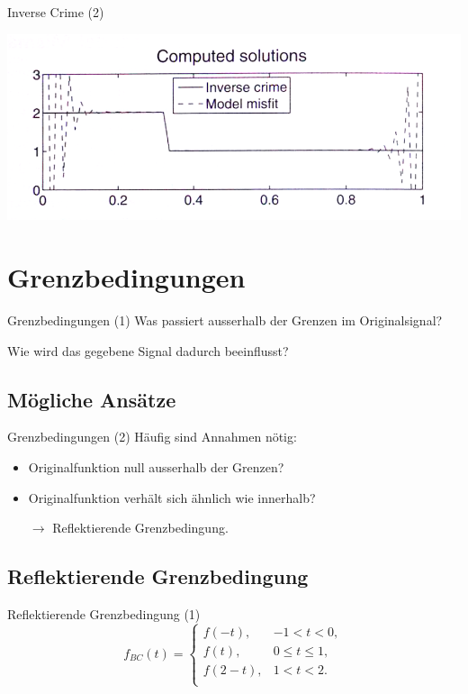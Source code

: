 \documentclass[11pt]{beamer}
\begin{document}
\begin{frame}{Inverse Crime (2)}

\begin{center}

\includegraphics[scale=0.5]{InverseCrime} 

\end{center}

\end{frame}


\section{Grenzbedingungen}
\begin{frame}{Grenzbedingungen (1)}
Was passiert ausserhalb der Grenzen im Originalsignal?

Wie wird das gegebene Signal dadurch beeinflusst?
\end{frame}


\subsection{Mögliche Ansätze}
\begin{frame}{Grenzbedingungen (2)}
Häufig sind Annahmen nötig:
\begin{itemize}
\item Originalfunktion null ausserhalb der Grenzen?
\item Originalfunktion verhält sich ähnlich wie innerhalb?

$\rightarrow$ Reflektierende Grenzbedingung.
\end{itemize}
\end{frame}


\subsection{Reflektierende Grenzbedingung}
\begin{frame}{Reflektierende Grenzbedingung (1)}
\[
f_{BC}(t) = \begin{cases}
f(-t), & -1 < t < 0,\\
f(t),  & 0 \leq t \leq 1,\\
f(2-t),& 1 < t < 2.\\
\end{cases}
\]
\end{frame}
\end{document}
